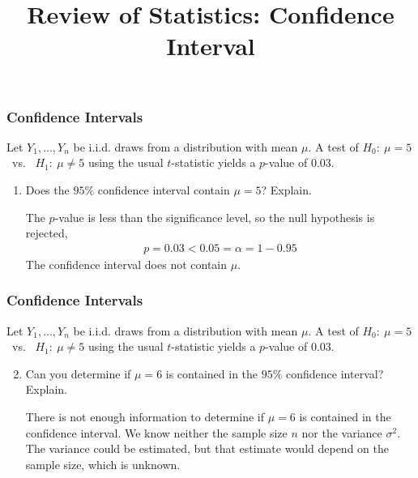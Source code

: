 \title[Probability]{Review of Statistics: Confidence Interval}
\date{}







\def\ask{Let $Y_1,\ldots,Y_n$ be i.i.d. draws from a distribution with mean $\mu$. A test of $H_0{:}~ \mu=5$ ~vs.~ $H_1{:}~ \mu \ne 5$ using the usual $t$-statistic yields a $p$-value of $0.03$.}


\begin{frame}
\frametitle{Confidence Intervals}
\ask
\begin{enumerate}\setcounter{enumi}{0}

\item Does the $95\%$ confidence interval contain $\mu=5$? Explain.

\begin{answer}
The $p$-value is less than the significance level, so the null hypothesis is rejected,
\begin{align*}
p = 0.03 < 0.05 = \alpha = 1-0.95
\end{align*}
The confidence interval does not contain $\mu$.
\end{answer}

\end{enumerate}

\end{frame}


\begin{frame}
\frametitle{Confidence Intervals}
\ask
\begin{enumerate}\setcounter{enumi}{1}

\item Can you determine if $\mu=6$ is contained in the $95\%$ confidence interval? Explain.

\begin{answer}
There is not enough information to determine if $\mu=6$ is contained in the confidence interval. We know neither the sample size $n$ nor the variance $\sigma^2$. The variance could be estimated, but that estimate would depend on the sample size, which is unknown. 
\end{answer}

\end{enumerate}

\end{frame}





